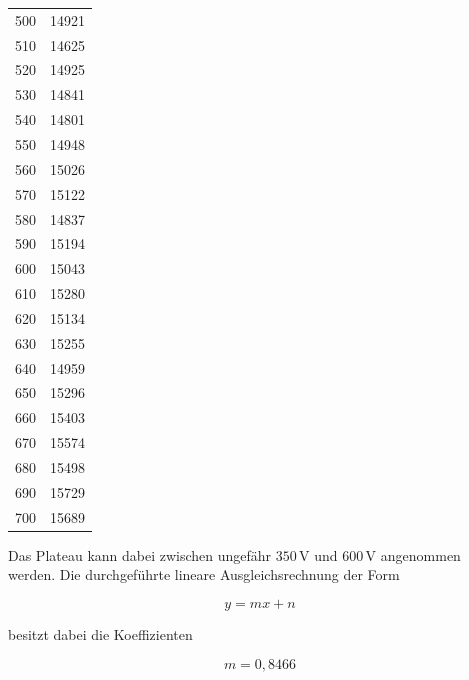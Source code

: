 \begin{table}[H]
\begin{tabular}{S[table-format=3.0] S[table-format=5.0]}
        500         &           14921           \\
        510         &           14625           \\
        520         &           14925           \\
        530         &           14841           \\
        540         &           14801           \\
        550         &           14948           \\
        560         &           15026           \\
        570         &           15122           \\
        580         &           14837           \\
        590         &           15194           \\
        600         &           15043           \\
        610         &           15280           \\
        620         &           15134           \\
        630         &           15255           \\
        640         &           14959           \\
        650         &           15296           \\
        660         &           15403           \\
        670         &           15574           \\
        680         &           15498           \\
        690         &           15729           \\
        700         &           15689           \\
    \bottomrule
    \end{tabular}
\end{table}

Das Plateau kann dabei zwischen ungefähr $350 \,\unit{\volt}$ und $600 \,\unit{\volt}$ angenommen werden.
Die durchgeführte lineare Ausgleichsrechnung der Form

\begin{equation*}
      y = m x + n
\end{equation*}

besitzt dabei die Koeffizienten

\begin{equation*}
      m = 0,8466 %
\end{equation*}

